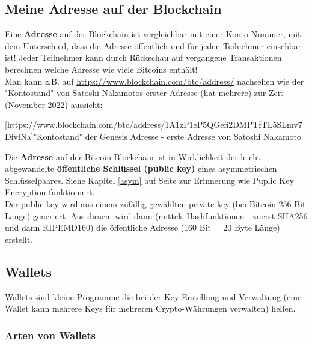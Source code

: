 \documentclass[10pt,a4paper,titlepage]{paper}
\begin{document}
\subsection{Meine Adresse auf der Blockchain}
Eine \textbf{Adresse} auf der Blockchain ist vergleichbar mit einer Konto Nummer, mit dem Unterschied, dass die Adresse öffentlich und für jeden Teilnehmer einsehbar ist! Jeder Teilnehmer kann durch Rückschau auf vergangene Transaktionen berechnen welche Adresse wie viele Bitcoins enthält!\\
Man kann z.B. auf \href{https://www.blockchain.com/btc/address/}{\color{blue}https://www.blockchain.com/btc/address/} nachsehen wie der "Kontostand" von Satoshi Nakamotos erster Adresse (hat mehrere) zur Zeit (November 2022) aussieht:
\begin{center}
[https://www.blockchain.com/btc/address/1A1zP1eP5QGefi2DMPTfTL5SLmv7DivfNa]{"Kontostand" der Genesis Adresse - erste Adresse von Satoshi Nakamoto}
\end{center}
Die \textbf{Adresse} auf der Bitcoin Blockchain ist in Wirklichkeit der leicht abgewandelte \textbf{öffentliche Schlüssel (public key)} eines asymmetrischen Schlüsselpaares. Siehe Kapitel \ref{asym} auf Seite \pageref{asym} zur Erinnerung wie Puplic Key Encryption funktioniert.\\
Der public key wird aus einem zufällig gewählten private key (bei Bitcoin 256 Bit Länge) generiert.   
Aus diesem wird dann (mittels Hashfunktionen - zuerst SHA256 und dann RIPEMD160) die öffentliche Adresse (160 Bit = 20 Byte Länge) erstellt.
\subsection{Wallets}
Wallets sind kleine Programme die bei der Key-Erstellung und Verwaltung (eine Wallet kann mehrere Keys für mehreren Crypto-Währungen verwalten) helfen.
\begin{center}
\end{center}
\subsubsection{Arten von Wallets}
\end{document}
